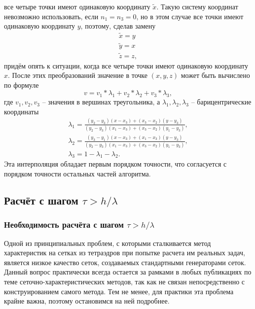 все четыре точки имеют одинаковую координату $\tilde{x}$. Такую систему
координат невозможно использовать, если $n_1=n_3=0$, но в этом случае все точки
имеют одинаковую координату $y$, поэтому, сделав замену
\begin{eqnarray}
\label{eq:new_coords_2}
\tilde{x}=y \\
\tilde{y}=x \nonumber \\
\tilde{z}=z,
\end{eqnarray}
придём опять к ситуации, когда все четыре точки имеют одинаковую координату $x$.
После этих преобразований значение в точке $(x,y,z)$ может быть вычислено по формуле
\begin{equation}
\label{eq:triangle_interpolation}
v=v_1*\lambda_1+v_2*\lambda_2+v_3*\lambda_3, 
\end{equation}
где $v_1,v_2,v_3$ -- значения в вершинах треугольника, а $\lambda_1,\lambda_2,\lambda_3$ -- барицентрические координаты
\begin{eqnarray}
\label{eq:barycentric_coords}
\lambda_1=\frac{(y_2-y_3)(x-x_3)+(x_3-x_2)(y-y_3)}{(y_2-y_3)(x_1-x_3)+(x_3-x_2)(y_1-y_3)}, \nonumber \\
\lambda_2=\frac{(y_3-y_1)(x-x_3)+(x_1-x_3)(y-y_3)}{(y_2-y_3)(x_1-x_3)+(x_3-x_2)(y_1-y_3)}, \nonumber \\
\lambda_3=1-\lambda_1-\lambda_2.
\end{eqnarray}
Эта интерполяция обладает первым порядком точности, что согласуется с порядком точности остальных частей алгоритма.


\clearpage
\newpage


\subsection{Расчёт с шагом $\tau > h/\lambda$}

\subsubsection{Необходимость расчёта с шагом $\tau > h/\lambda$}

Одной из принципиальных проблем, с которыми сталкивается метод характеристик на сетках из тетраэдров при попытке расчета им реальных задач, является низкое качество сеток, создаваемых стандартными генераторами сеток. Данный вопрос практически всегда остается за рамками в любых публикациях по теме сеточно-характеристических методов, так как не связан непосредственно с конструированием самого метода. Тем не менее, для практики эта проблема крайне важна, поэтому остановимся на ней подробнее.

